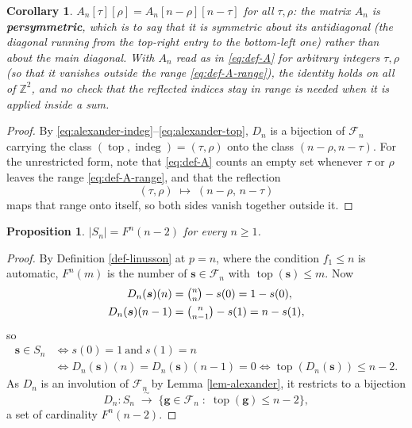 \documentclass[11pt, a4paper, abstract=yes]{scrartcl}
\theoremstyle{definition}
\theoremstyle{remark}
\theoremstyle{plain}
\newtheorem{proposition}[definition]{Proposition}
\newtheorem{corollary}[definition]{Corollary}
\newcommand{\vek}[1]{\boldsymbol{#1}}
\newcommand{\indeg}{\operatorname{indeg}}
\newcommand{\tp}{\operatorname{top}}
\begin{document}
\begin{corollary}
\(A_n[\tau][\rho]=A_n[n-\rho][n-\tau]\) for all \(\tau,\rho\): the matrix \(A_n\) is \textbf{persymmetric}, which
is to say that it is symmetric about its antidiagonal (the diagonal running from the top-right entry
to the bottom-left one) rather than about the main diagonal. With
\(A_n\) read as in \eqref{eq:def-A} for arbitrary integers \(\tau,\rho\) (so that it vanishes
outside the range \eqref{eq:def-A-range}), the identity holds on all of \(\mathbb Z^2\), and no
check that the reflected indices stay in range is needed when it is applied inside a sum.
\label{cor-persymmetry}
\end{corollary}

\begin{proof}
By \eqref{eq:alexander-indeg}--\eqref{eq:alexander-top}, \(D_n\) is a bijection of \(\mathcal F_n\) carrying the class
\((\tp,\indeg)=(\tau,\rho)\) onto the class \((n-\rho,n-\tau)\). For the unrestricted form, note that
\eqref{eq:def-A} counts an empty set whenever \(\tau\) or \(\rho\) leaves the range
\eqref{eq:def-A-range}, and that the reflection
\begin{equation}\label{eq:persymmetry-reflection}
  (\tau,\rho)\;\longmapsto\;(n-\rho,\,n-\tau)
\end{equation}
maps that range onto itself, so both sides vanish together outside it.
\end{proof}

\begin{proposition}
\(\lvert S_n\rvert=F^n(n-2)\) for every \(n\ge1\).
\label{prop-fnn2}
\end{proposition}

\begin{proof}
By Definition \ref{def-linusson} at \(p=n\), where the condition \(f_1\le n\) is automatic,
\(F^n(m)\) is the number of \(\vek s\in\mathcal F_n\) with \(\tp(\vek s)\le m\). Now
\begin{align}
  D_n(\vek s)(n)   &= \tbinom nn-s(0) = 1-s(0) ,\label{eq:D-top}\\
  D_n(\vek s)(n-1) &= \tbinom n{n-1}-s(1) = n-s(1) ,\label{eq:D-next}
\end{align}
so
\begin{align*}
  \vek s\in S_n
  &\iff s(0)=1\ \text{and}\ s(1)=n\\
  &\iff D_n(\vek s)(n)=D_n(\vek s)(n-1)=0
   \iff \tp(D_n(\vek s))\le n-2 .
\end{align*}
As \(D_n\) is an involution of \(\mathcal F_n\) by Lemma \ref{lem-alexander}, it restricts to a bijection
\begin{equation}\label{eq:Sn-bijection}
  D_n\colon S_n\;\xrightarrow{\ \sim\ }\;\bigl\lbrace\vek g\in\mathcal F_n\;:\;\tp(\vek g)\le n-2\bigr\rbrace ,
\end{equation}
a set of cardinality \(F^n(n-2)\).
\end{proof}
\end{document}
